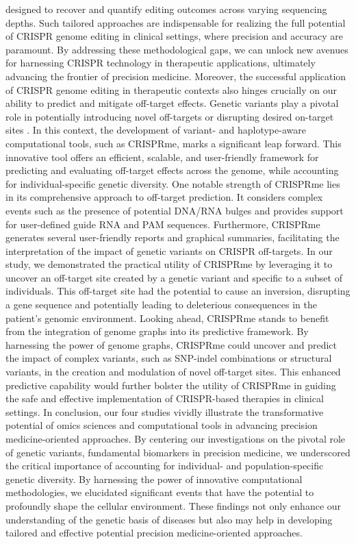 \documentclass[a4paper, titlepage, openright]{book}
\newcommand{\crisprme}{CRISPRme\xspace}
\begin{document}
designed to recover and quantify editing outcomes across varying sequencing depths. Such tailored approaches are indispensable for realizing the full potential of CRISPR genome editing in clinical settings, where precision and accuracy are paramount. By addressing these methodological gaps, we can unlock new avenues for harnessing CRISPR technology in therapeutic applications, ultimately advancing the frontier of precision medicine. Moreover, the successful application of CRISPR genome editing in therapeutic contexts also hinges crucially on our ability to predict and mitigate off-target effects. Genetic variants play a pivotal role in potentially introducing novel off-targets or disrupting desired on-target sites \citep{lessard2017human,scott2017implications}. In this context, the development of variant- and haplotype-aware computational tools, such as \crisprme \citep{cancellieri2023human}, marks a significant leap forward. This innovative tool offers an efficient, scalable, and user-friendly framework for predicting and evaluating off-target effects across the genome, while accounting for individual-specific genetic diversity. One notable strength of \crisprme lies in its comprehensive approach to off-target prediction. It considers complex events such as the presence of potential DNA/RNA bulges and provides support for user-defined guide RNA and PAM sequences. Furthermore, \crisprme generates several user-friendly reports and graphical summaries, facilitating the interpretation of the impact of genetic variants on CRISPR off-targets. In our study, we demonstrated the practical utility of \crisprme by leveraging it to uncover an off-target site created by a genetic variant and specific to a subset of individuals. This off-target site had the potential to cause an inversion, disrupting a gene sequence and potentially leading to deleterious consequences in the patient's genomic environment. Looking ahead, \crisprme stands to benefit from the integration of genome graphs into its predictive framework. By harnessing the power of genome graphs, \crisprme could uncover and predict the impact of complex variants, such as SNP-indel combinations or structural variants, in the creation and modulation of novel off-target sites. This enhanced predictive capability would further bolster the utility of \crisprme in guiding the safe and effective implementation of CRISPR-based therapies in clinical settings. In conclusion, our four studies vividly illustrate the transformative potential of omics sciences and computational tools in advancing precision medicine-oriented approaches. By centering our investigations on the pivotal role of genetic variants, fundamental biomarkers in precision medicine, we underscored the critical importance of accounting for individual- and population-specific genetic diversity.  By harnessing the power of innovative computational methodologies, we elucidated significant events that have the potential to profoundly shape the cellular environment. These findings not only enhance our understanding of the genetic basis of diseases but also may help in developing tailored and effective potential precision medicine-oriented approaches.
\end{document}
